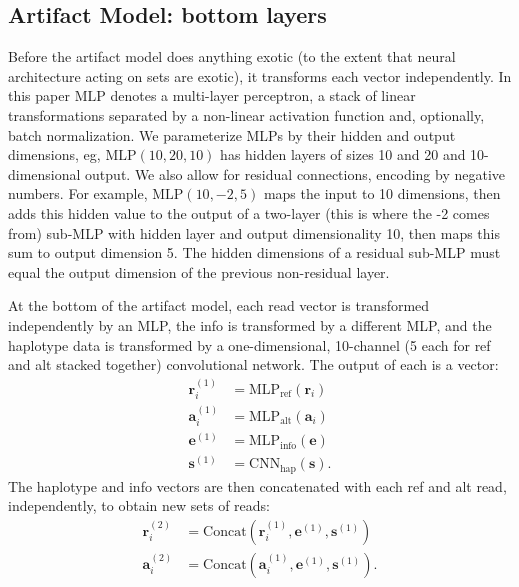 \documentclass[times, twoside, watermark]{StyleBioRxiv}
\begin{document}
\subsection*{Artifact Model: bottom layers} 
Before the artifact model does anything exotic (to the extent that neural architecture acting on sets are exotic), it transforms each vector independently.  In this paper $\mathrm{MLP}$ denotes a multi-layer perceptron, a stack of linear transformations separated by a non-linear activation function and, optionally, batch normalization.  We parameterize MLPs by their hidden and output dimensions, eg, $\mathrm{MLP}(10,20,10)$ has hidden layers of sizes 10 and 20 and 10-dimensional output.  We also allow for residual connections, encoding by negative numbers.  For example, $\mathrm{MLP}(10,-2,5)$ maps the input to 10 dimensions, then adds this hidden value to the output of a two-layer (this is where the -2 comes from) sub-MLP with hidden layer and output dimensionality 10, then maps this sum to output dimension 5.  The hidden dimensions of a residual sub-MLP must equal the output dimension of the previous non-residual layer.

At the bottom of the artifact model, each read vector is transformed independently by an MLP, the info is transformed by a different MLP, and the haplotype data is transformed by a one-dimensional, 10-channel (5 each for ref and alt stacked together) convolutional network.  The output of each is a vector:
\begin{align}
    \mathbf{r}_i^{(1)} &= \mathrm{MLP}_\mathrm{ref} (\mathbf{r}_i) \\
    \mathbf{a}_i^{(1)} &= \mathrm{MLP}_\mathrm{alt} (\mathbf{a}_i) \\
    \mathbf{e}^{(1)} &= \mathrm{MLP}_\mathrm{info} (\mathbf{e}) \\
    \mathbf{s}^{(1)} &= \mathrm{CNN}_\mathrm{hap} (\mathbf{s}).
\end{align}
The haplotype and info vectors are then concatenated with each ref and alt read, independently, to obtain new sets of reads:
\begin{align}
    \mathbf{r}_i^{(2)} &= \mathrm{Concat}\left( \mathbf{r}_i^{(1)}, \mathbf{e}^{(1)}, \mathbf{s}^{(1)} \right) \\
    \mathbf{a}_i^{(2)} &= \mathrm{Concat}\left( \mathbf{a}_i^{(1)}, \mathbf{e}^{(1)}, \mathbf{s}^{(1)} \right).
\end{align}
\end{document}
